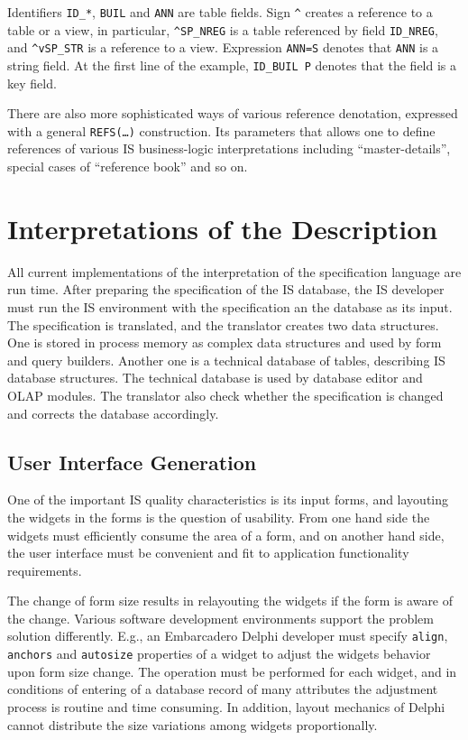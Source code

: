 \documentclass[conference]{IEEEtran}
\begin{document}
Identifiers \texttt{ID\_*}, \texttt{BUIL} and \texttt{ANN} are table fields.  Sign \texttt{\^} creates a reference to a table or a view, in particular, \texttt{\^{}SP\_NREG} is a table referenced by field \texttt{ID\_NREG}, and \texttt{\^{}vSP\_STR} is a reference to a view.  Expression \texttt{ANN=S} denotes that \texttt{ANN} is a string field.  At the first line of the example, \texttt{ID\_BUIL P} denotes that the field is a key field.

There are also more sophisticated ways of various reference denotation, expressed with a general \texttt{REFS(\ldots)} construction.  Its parameters that allows one to define references of various IS business-logic interpretations including ``master-details'', special cases of ``reference book'' and so on.

\section{Interpretations of the Description}
\label{sec:interpr-descr}

All current implementations of the interpretation of the specification language are run time.  After preparing the specification of the IS database, the IS developer must run the IS environment with the specification an the database as its input.  The specification is translated, and the translator creates two data structures.  One is stored in process memory as complex data structures and used by form and query builders.  Another one is a technical database of tables, describing IS database structures.  The technical database is used by database editor and OLAP modules.  The translator also check whether the specification is changed and corrects the database accordingly.

\subsection{User Interface Generation}
\label{sec:user-interace-form}
One of the important IS quality characteristics is its input forms, and layouting the widgets in the forms is the question of usability.  From one hand side the widgets must efficiently consume the area of a form, and on another hand side, the user interface must be convenient and fit to  application functionality requirements.

The change of form size results in relayouting the widgets if the form is aware of the change.  Various software development environments support the problem solution differently.  E.g., an Embarcadero Delphi developer must specify \texttt{align}, \texttt{anchors} and \texttt{autosize} properties of a widget to adjust the widgets behavior upon form size change.  The operation must be performed for each widget, and in conditions of entering of a database record of many attributes the adjustment process is routine and time consuming.  In addition, layout mechanics of Delphi cannot distribute the size variations among widgets proportionally.
\end{document}
